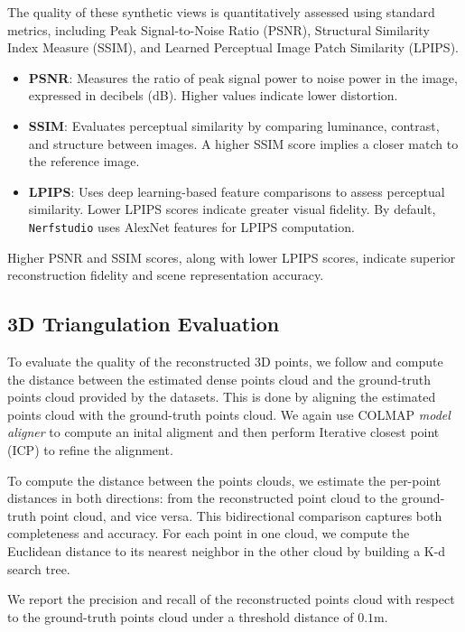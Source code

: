 The quality of these synthetic views is quantitatively assessed using standard metrics, including Peak Signal-to-Noise Ratio (PSNR), Structural Similarity Index Measure (SSIM), and Learned Perceptual Image Patch Similarity (LPIPS). 

\begin{itemize}
    \item \textbf{PSNR}: Measures the ratio of peak signal power to noise power in the image, expressed in decibels (dB). Higher values indicate lower distortion.
    \item \textbf{SSIM}: Evaluates perceptual similarity by comparing luminance, contrast, and structure between images. A higher SSIM score implies a closer match to the reference image.
    \item \textbf{LPIPS}: Uses deep learning-based feature comparisons to assess perceptual similarity. Lower LPIPS scores indicate greater visual fidelity. By default, \texttt{Nerfstudio} uses AlexNet features for LPIPS computation.
\end{itemize}

Higher PSNR and SSIM scores, along with lower LPIPS scores, indicate superior reconstruction fidelity and scene representation accuracy.

\subsection{3D Triangulation Evaluation}

To evaluate the quality of the reconstructed 3D points, we follow \cite{Knapitsch2017} and compute the distance between the estimated dense points cloud and the ground-truth points cloud provided by the datasets.
This is done by aligning the estimated points cloud with the ground-truth points cloud. We again use COLMAP \textit{model aligner} to compute an inital aligment and then perform Iterative closest point (ICP) \cite{Besl1992} to refine the alignment.

To compute the distance between the points clouds, we estimate the per-point distances in both directions: from the reconstructed point cloud to the ground-truth point cloud, and vice versa. 
This bidirectional comparison captures both completeness and accuracy. For each point in one cloud, we compute the Euclidean distance to its nearest neighbor in the other cloud by building a K-d search tree.

We report the precision and recall of the reconstructed points cloud with respect to the ground-truth points cloud under a threshold distance of $0.1$m.

